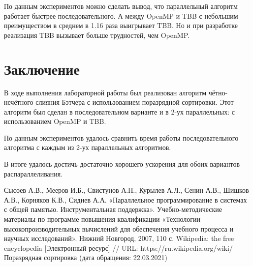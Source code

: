 \documentclass{report}
\begin{document}
\par По данным экспериментов можно сделать вывод, что параллельный алгоритм работает быстрее последовательного. А между OpenMP и TBB с небольшим преимуществом в среднем в 1.16 раза выигрывает TBB. Но и при разработке реализация TBB вызывает больше трудностей, чем OpenMP.
\newpage

\section*{Заключение}
В ходе выполнения лабораторной работы был реализован алгоритм чётно-нечётного слияния Бэтчера с использованием поразрядной сортировки. Этот алгоритм был сделан в последовательном варианте и в 2-ух параллельных: с использованием OpenMP и TBB.
\par По данным экспериментов удалось сравнить время работы последовательного алгоритма с каждым из 2-ух параллельных алгоритмов.
\par В итоге удалось достичь достаточно хорошего ускорения для обоих вариантов распараллеливания.
\newpage

\begin{thebibliography}{1}
 Сысоев А.В., Мееров И.Б., Свистунов А.Н., Курылев А.Л., Сенин А.В., Шишков А.В., Корняков К.В., Сиднев А.А. «Параллельное программирование в системах с общей памятью. Инструментальная поддержка». Учебно-методические материалы по программе повышения квалификации «Технологии высокопроизводительных вычислений для обеспечения учебного процесса и научных исследований». Нижний Новгород, 2007, 110 с.
 Wikipedia: the free encyclopedia [Электронный ресурс] // URL: https://ru.wikipedia.org/wiki/Поразрядная сортировка (дата обращения: 22.03.2021)
\end{thebibliography}
\newpage

\end{document}
